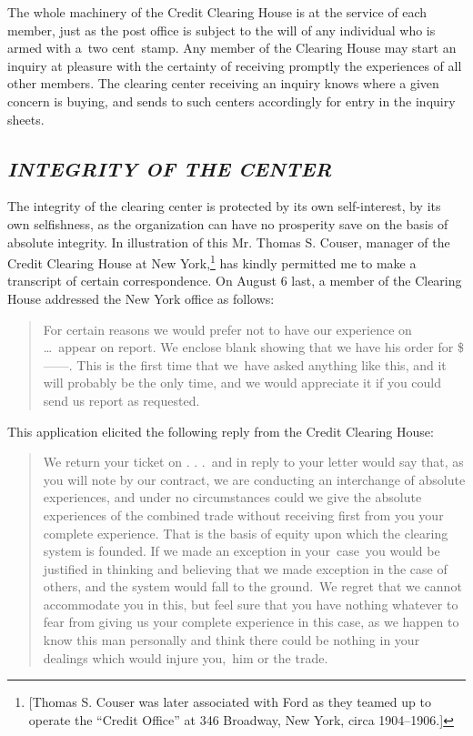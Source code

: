 \documentclass[openany,nobib]{tufte-book}
\begin{document}
The whole machinery of the Credit Clearing House is at the service of
each member, just as the post office is subject to the will of any
individual who is armed with a~two cent~stamp. Any member of the
Clearing House may start an inquiry at pleasure with the certainty of
receiving promptly the experiences of all other members. The clearing
center receiving an inquiry knows where a given concern is buying, and
sends to such centers accordingly for entry in the inquiry sheets.~

\hypertarget{integrity-of-the-center}{%
\subsection{\texorpdfstring{\emph{INTEGRITY OF THE
CENTER}}{INTEGRITY OF THE CENTER}}\label{integrity-of-the-center}}

The integrity of the clearing center is protected by its own
self-interest, by its own selfishness, as the organization can have no
prosperity save on the basis of absolute integrity. In illustration of
this Mr. Thomas S. Couser, manager of the Credit Clearing House at New
York,\footnote{{[}Thomas S. Couser was later associated with Ford as
  they teamed up to operate the ``Credit Office'' at 346 Broadway, New
  York, circa 1904--1906.{]}} has kindly permitted me to make a
transcript of certain correspondence. On August 6 last, a member of the
Clearing House addressed the New York office as follows:~

\begin{quote}
For certain reasons we would prefer not to have our experience on \ldots~appear on report. We enclose blank showing that we have his order for
\$------. This is the first time that we~have asked anything like this,
and it will probably be the only time, and we would appreciate it if you
could send us report as requested.~
\end{quote}

This application elicited the following reply from the Credit Clearing
House:~~

\begin{quote}
We return your ticket on . . .~and in reply to your letter would say
that, as you will note by our contract, we are conducting an interchange
of absolute experiences, and under no circumstances could we give the
absolute experiences of the combined trade without receiving first from
you your complete experience. That is the basis of equity upon which the
clearing system is founded. If we made an exception in your~case~you
would be justified in thinking and believing that we made exception in
the case of others, and the system would fall to the ground.~We regret
that we cannot accommodate you in this, but feel sure that you have
nothing whatever to fear from giving us your complete experience in this
case, as we happen to know this man personally and think there could be
nothing in your dealings which would injure you,~him or the trade.~
\end{quote}
\end{document}
